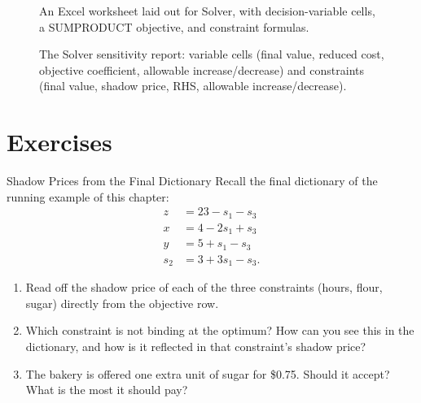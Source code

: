 \begin{figure}[h!]
\centering
{}
\caption{An Excel worksheet laid out for Solver, with decision-variable cells, a SUMPRODUCT objective, and constraint formulas.}
\label{fig:excel-setup}
\end{figure}

\begin{figure}[h!]
\centering
{}
\caption{The Solver sensitivity report: variable cells (final value, reduced cost, objective coefficient, allowable increase/decrease) and constraints (final value, shadow price, RHS, allowable increase/decrease).}
\label{fig:excel-sensitivity-report}
\end{figure}

\section{Exercises}


\begin{ex}{Shadow Prices from the Final Dictionary}{}
 Recall the final dictionary of the running example of this chapter:
\[
\begin{aligned}
z &= 23 - s_1 - s_3 \\
x &= 4 - 2s_1 + s_3 \\
y &= 5 + s_1 - s_3 \\
s_2 &= 3 + 3s_1 - s_3.
\end{aligned}
\]
\begin{enumerate}
\item Read off the shadow price of each of the three constraints (hours, flour, sugar) directly from the objective row.
\item Which constraint is not binding at the optimum? How can you see this in the dictionary, and how is it reflected in that constraint's shadow price?
\item The bakery is offered one extra unit of sugar for \$0.75. Should it accept? What is the most it should pay?
\end{enumerate}
\exrefs{\S\ref{sec:sensitivity-rhs}}
\end{ex}

